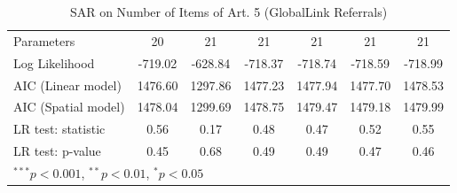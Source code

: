 \begin{table}[!h]
\begin{center}
\begin{tabular}{l c c c c c c }
Parameters              & 20           & 21           & 21           & 21           & 21           & 21           \\
Log Likelihood          & -719.02      & -628.84      & -718.37      & -718.74      & -718.59      & -718.99      \\
AIC (Linear model)      & 1476.60      & 1297.86      & 1477.23      & 1477.94      & 1477.70      & 1478.53      \\
AIC (Spatial model)     & 1478.04      & 1299.69      & 1478.75      & 1479.47      & 1479.18      & 1479.99      \\
LR test: statistic      & 0.56         & 0.17         & 0.48         & 0.47         & 0.52         & 0.55         \\
LR test: p-value        & 0.45         & 0.68         & 0.49         & 0.49         & 0.47         & 0.46         \\
\bottomrule
\multicolumn{7}{l}{\scriptsize{$^{***}p<0.001$, $^{**}p<0.01$, $^*p<0.05$}}
\end{tabular}
\caption{SAR on Number of Items of Art. 5 (GlobalLink Referrals)}
\label{table:coefficients}
\end{center}
\end{table}
